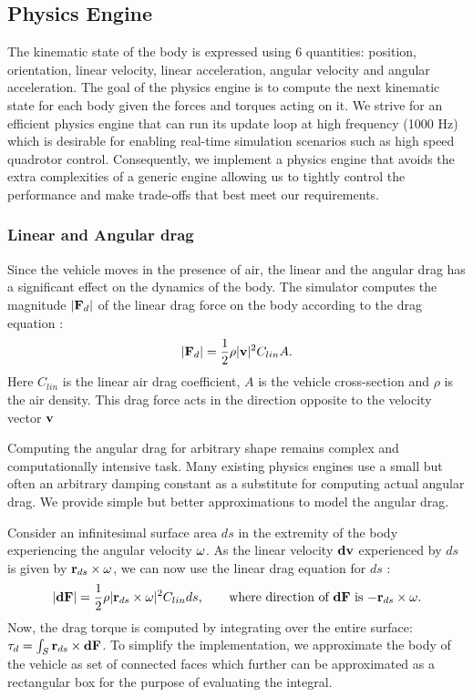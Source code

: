 \documentclass[graybox]{svmult}
\begin{document}
	\subsection{Physics Engine}
	The kinematic state of the body is expressed using 6 quantities: position, orientation, linear velocity, linear acceleration, angular velocity and angular acceleration. The goal of the physics engine is to compute the next kinematic state for each body given the forces and torques acting on it. We strive for an efficient physics engine that can run its update loop at high frequency (1000 Hz) which is desirable for enabling real-time simulation scenarios such as high speed quadrotor control. Consequently, we implement a physics engine that avoids the extra complexities of a generic engine allowing us to tightly control the performance and make trade-offs that best meet our requirements.
	
	\subsubsection{Linear and Angular drag}
	Since the vehicle moves in the presence of air, the linear and the angular drag has a significant effect on the dynamics of the body. The simulator computes the magnitude $|{\bf F}_d|$ of the linear drag force on the body according to the drag equation \cite{taylor2005classical}:
	\begin{equation*}
	|{\bf F}_d| = \frac{1}{2}\rho |{\bf v}|^2 C_{lin} A.
	\end{equation*}
	Here $C_{lin}$ is the linear air drag coefficient, $A$ is the vehicle cross-section and $\rho$ is the air density. This drag force acts in the direction opposite to the velocity vector ${\bf v}$
	
	Computing the angular drag for arbitrary shape remains complex and computationally intensive task. Many existing physics engines use a small but often an arbitrary damping constant as a substitute for computing actual angular drag. We provide simple but better approximations to model the angular drag.
	
	Consider an infinitesimal surface area $ds$ in the extremity of the body experiencing the angular velocity ${\bf \omega}$. As the linear velocity ${\bf dv}$ experienced by $ds$ is given by ${\bf r}_{ds} \times {\bf \omega}$, we can now use the linear drag equation for $ds$ \cite[pp 160-161]{nakayama1998introduction}:
	\begin{equation*}
	|{\bf dF}| = \frac{1}{2}\rho |{\bf r}_{ds} \times {\bf \omega}|^{2} C_{lin} {ds}
	\mbox{,\hspace{0.25in} where direction of ${\bf dF}$ is $-{\bf r}_{ds} \times {\bf \omega}$}.
	\end{equation*}
	Now, the drag torque is computed by integrating over the entire surface: ${\bf \tau}_{d} = \int_{S} {\bf r}_{ds} \times {\bf dF}$.
	To simplify the implementation, we approximate the body of the vehicle as set of connected faces which further can be approximated as a rectangular box for the purpose of evaluating the integral.
	
\end{document}
